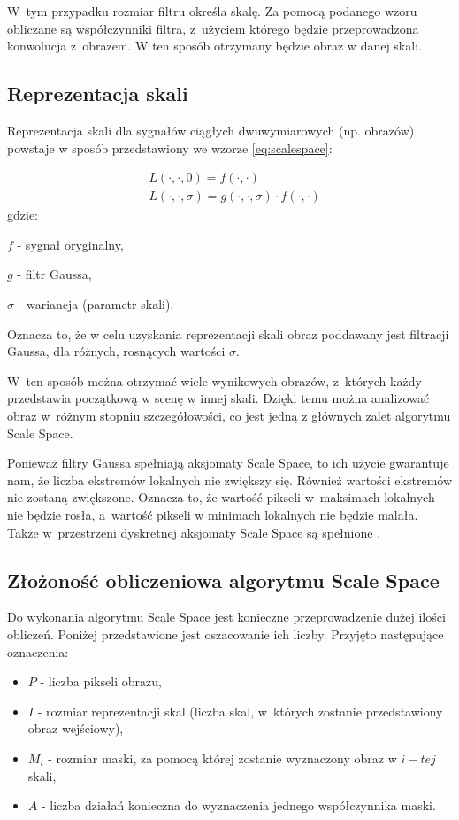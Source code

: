 W~tym przypadku rozmiar filtru określa skalę. Za pomocą podanego wzoru obliczane są współczynniki filtra, z~użyciem którego będzie przeprowadzona konwolucja z~obrazem. W ten sposób otrzymany będzie obraz w danej skali.

\subsection{Reprezentacja skali}
\label{subsec:reprezentacjaskali}
Reprezentacja skali dla sygnałów ciągłych dwuwymiarowych (np. obrazów) powstaje w sposób przedstawiony we wzorze \eqref{eq:scalespace}:

\begin{equation}
\label{eq:scalespace}
\begin{split}
& L(\cdot,\cdot,0) = f(\cdot,\cdot) \\
& L(\cdot,\cdot,\sigma) = g(\cdot,\cdot,\sigma)\cdot f(\cdot,\cdot)
\end{split}
\end{equation}
gdzie:

$ f $ - sygnał oryginalny,

$ g $ - filtr Gaussa, 

$ \sigma $ - wariancja (parametr skali).

Oznacza to, że w celu uzyskania reprezentacji skali obraz poddawany jest filtracji Gaussa, dla różnych, rosnących wartości $ \sigma $.

W~ten sposób można otrzymać wiele wynikowych obrazów, z~których każdy przedstawia początkową w scenę w innej skali. Dzięki temu można analizować obraz w~różnym stopniu szczegółowości, co jest jedną z głównych zalet algorytmu Scale Space.

Ponieważ filtry Gaussa spełniają aksjomaty Scale Space, to ich użycie gwarantuje nam, że liczba ekstremów lokalnych nie zwiększy się. Również wartości ekstremów nie zostaną zwiększone. Oznacza to, że wartość pikseli w~maksimach lokalnych nie będzie rosła, a~wartość pikseli w minimach lokalnych nie będzie malała. Także w~przestrzeni dyskretnej aksjomaty Scale Space są spełnione \cite{SSFDS}.

\subsection{Złożoność obliczeniowa algorytmu Scale Space}
\label{subsec:zlozonosc_obliczeniowa}

Do wykonania algorytmu Scale Space jest konieczne przeprowadzenie dużej ilości obliczeń. Poniżej przedstawione jest oszacowanie ich liczby. Przyjęto następujące oznaczenia:
\begin{itemize}
\item $ P $ - liczba pikseli obrazu,
\item $ I $ - rozmiar reprezentacji skal (liczba skal, w~których zostanie przedstawiony obraz wejściowy),
\item $ M_i $ - rozmiar maski, za pomocą której zostanie wyznaczony obraz w $ i-tej $ skali,
\item $ A $ - liczba działań konieczna do wyznaczenia jednego współczynnika maski.
\end{itemize}


